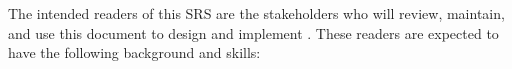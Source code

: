 \documentclass[12pt]{article}
\begin{document}



The intended readers of this SRS are the stakeholders who will review, maintain, and use this document to design and implement \progname{}. These readers are expected to have the following background and skills:
\end{document}
